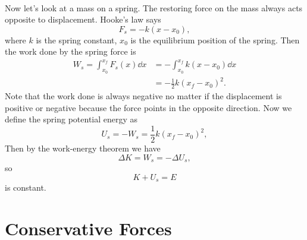\documentclass[../classical_mechanics.tex]{subfiles}
\begin{document}
        \paragraph{}
        Now let's look at a mass on a spring. The restoring force on the mass always acts opposite to displacement. Hooke's law says
        \begin{equation}
            F_s=-k(x-x_0),
        \end{equation}
        where $k$ is the spring constant, $x_0$ is the equilibrium position of the spring.
        Then the work done by the spring force is
        \begin{align}
            W_s=\int_{x_0}^{x_f}F_s(x)\dd{x}&=-\int_{x_0}^{x_f}k(x-x_0)\dd{x}\\
            &=-\frac{1}{2}k(x_f-x_0)^2.
        \end{align}
        Note that the work done is always negative no matter if the displacement is positive or negative because the force points in the opposite direction.
        Now we define the spring potential energy as
        \begin{equation}
            U_s=-W_s=\frac{1}{2}k(x_f-x_0)^2,
        \end{equation}
        Then by the work-energy theorem we have
        \begin{equation}
            \Delta K=W_s=-\Delta U_s,
        \end{equation}
        so
        \begin{equation}
            K+U_s=E
        \end{equation}
        is constant.


    \section{Conservative Forces}\label{sec:conservative-forces}
\end{document}
